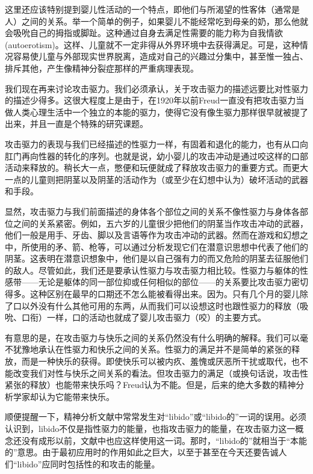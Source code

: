 \documentclass[UTF8,10pt,a4paper,openany]{book}
\begin{document}
这里还应该特别提到婴儿性活动的一个特点，即他们与所渴望的性客体（通常是人）之间的关系。举一个简单的例子，如果婴儿不能经常吃到母亲的奶，那么他就会吸吮自己的拇指或脚趾。这种通过自身去满足性需要的能力称为自我情欲(autoerotism)。这样、儿童就不一定非得从外界环境中去获得满足。可是，这种情况容易使儿童与外部现实世界脱离，造成对自己的兴趣过分集中，甚至惟一独占、排斥其他，产生像精神分裂症那样的严重病理表现。

我们现在再来讨论攻击驱力。我们必须承认，关于攻击驱力的描述远要比对性驱力的描述少得多。这很大程度上是由于，在1920年以前Freud一直没有把攻击驱力当做人类心理生活中一个独立的本能的驱力，使得它没有像生驱力那样很早就被提了出来，并且一直是个特殊的研究课题。

攻击驱力的表现与我们已经描述的性驱力一样，有固着和退化的能力，也有从口向肛门再向性器的转化的序列。也就是说，幼小婴儿的攻击冲动是通过咬这样的口部活动来释放的。稍长大一点，憋便和玩便就成了释放攻击驱力的重要方式。而更大一点的儿童则把阴茎以及阴茎的活动作为（或至少在幻想中认为）破坏活动的武器和手段。

显然，攻击驱力与我们前面描述的身体各个部位之间的关系不像性驱力与身体各部位之间的关系紧密。例如，五六岁的儿童很少把他们的阴茎当作攻击冲动的武器，他们一般是用手、牙齿、脚以及言语等作为攻击冲动的武器。然而在游戏和幻想之中，所使用的矛、箭、枪等，可以通过分析发现它们在潜意识思想中代表了他们的阴茎。这表明在潜意识想象中，他们是以自己强有力的而又危险的阴茎去征服他们的敌人。尽管如此，我们还是要承认性驱力与攻击驱力相比较。性驱力与躯体的性感带——无论是躯体的同一部位抑或任何相似的部位——的关系要比攻击驱力密切得多。这种区别在最早的口期还不怎么能被看得出来。因为。只有几个月的婴儿除了口以外没有什么其他可用的东两，从而我们可以设想这时也跟性驱力的释放（吸吮、口衔）一样，口的活动也就成了婴儿攻击驱力（咬）的主要方式。

有意思的是，在攻击驱力与快乐之间的关系仍然没有什么明确的解释。我们可以毫不犹豫地承认在性驱力和快乐之间的关系。性驱力的满足并不是简单的紧张的释放，而是一种快乐的获得。即使快乐可以被内疚、羞愧或厌恶所干扰或取代，也不能改变我们对性与快乐之间关系的看法。但攻击驱力的满足（或换句话说，攻击性紧张的释放）也能带来快乐吗？Freud认为不能。但是，后来的绝大多数的精神分析学家却认为它能带来快乐。

顺便提醒一下，精神分析文献中常常发生对“libido”或“libido的”一词的误用。必须认识到，libido不仅是指性驱力的能量，也指攻击驱力的能量，在攻击驱力这一概念还没有成形以前，文献中也应这样使用这一词。那时，“libido的”就相当于“本能的”意思。由于最初应用时的作用如此之巨大，以至于甚至在今天还要告诚人们“libido”应同时包括性的和攻击的能量。
\end{document}
